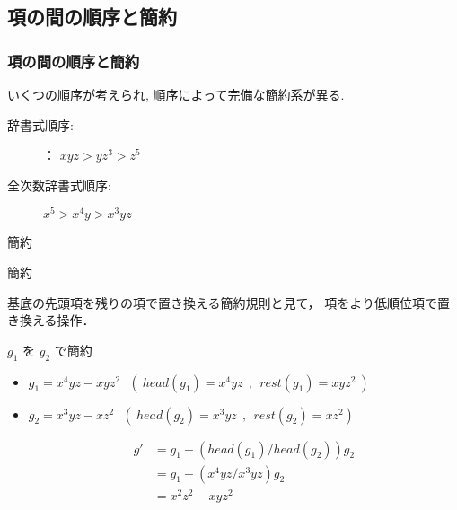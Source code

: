 \subsection{項の間の順序と簡約}
\begin{frame}\frametitle{項の間の順序と簡約}

いくつの順序が考えられ, 順序によって完備な簡約系が異る.

\begin{description}
\item [辞書式順序:]：   $xyz > yz^3 > z^5$ 
\item [全次数辞書式順序:]  $x^5 > x^4y > x^3yz$ 
\end{description}
\end{frame}

\begin{frame}{簡約}
\begin{block}{簡約}
 
基底の先頭項を残りの項で置き換える簡約規則と見て，
項をより低順位項で置き換える操作．
\end{block}

\begin{exampleblock}{$g_1$ を $g_2$ で簡約}
\begin{itemize}

\item $g_1 = x^4yz - xyz^2~~~(~head(g_1) = x^4yz~~,~~rest(g_1) = xyz^2~)~ $

\item $g_2 = x^3yz - xz^2~~~(~head(g_2) = x^3yz~~,~~rest(g_2) = xz^2)~ $

\[
\begin{array}{ll}
g' & = g_1 - ( head(g_1) / head(g_2) ) g_2 \\
   & = g_1 - ( x^4yz / x^3yz ) g_2 \\
   & = x^2z^2 - xyz^2
\end{array}
\]
\end{itemize}
\end{exampleblock}
\end{frame}

